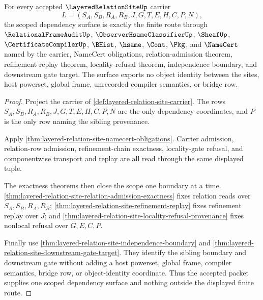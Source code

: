 \begin{theorem}
\label{thm:layered-relation-site-scoped-dependency-surface}
For every accepted $\LayeredRelationSiteUp$ carrier
$$
L=(S_A,S_B,R_A,R_B,J,G,T,E,H,C,P,N),
$$
the scoped dependency surface is exactly the finite route through $\RelationalFrameAuditUp$, $\ObserverHsameClassifierUp$, $\SheafUp$, $\CertificateCompilerUp$, $\BHist$, $\hsame$, $\Cont$, $\Pkg$, and $\NameCert$ named by the carrier, NameCert obligations, relation-admission theorem, refinement replay theorem, locality-refusal theorem, independence boundary, and downstream gate target. The surface exports no object identity between the sites, host powerset, global frame, unrecorded compiler semantics, or bridge row.
\end{theorem}
\begin{proof}
Project the carrier of \autoref{def:layered-relation-site-carrier}. The rows $S_A,S_B,R_A,R_B,J,G,T,E,H,C,P,N$ are the only dependency coordinates, and $P$ is the only row naming the sibling provenance.

Apply \autoref{thm:layered-relation-site-namecert-obligations}. Carrier admission, relation-row admission, refinement-chain exactness, locality-gate refusal, and componentwise transport and replay are all read through the same displayed tuple.

The exactness theorems then close the scope one boundary at a time. \autoref{thm:layered-relation-site-relation-admission-exactness} fixes relation reads over $S_A,S_B,R_A,R_B$; \autoref{thm:layered-relation-site-refinement-replay} fixes refinement replay over $J$; and \autoref{thm:layered-relation-site-locality-refusal-provenance} fixes nonlocal refusal over $G,E,C,P$.

Finally use \autoref{thm:layered-relation-site-independence-boundary} and \autoref{thm:layered-relation-site-downstream-gate-target}. They identify the sibling boundary and downstream gate without adding a host powerset, global frame, compiler semantics, bridge row, or object-identity coordinate. Thus the accepted packet supplies one scoped dependency surface and nothing outside the displayed finite route.
\end{proof}


